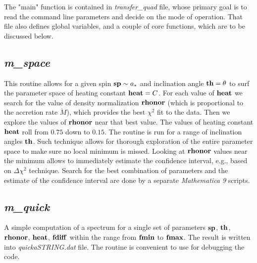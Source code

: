 \documentclass{emulateapj}
\newcommand{\mat}{\textit{Mathematica 9 }}
\begin{document}
The "main" function is contained in \textit{transfer\_quad} file,
whose primary goal is to read the command line parameters and decide
on the mode of operation. That file also defines global variables, and
a couple of core functions, which are to be discussed below.

\subsection{\textit{m\_space}}
This routine allows for a given spin ${\bf sp}\sim a_*$ and inclination angle ${\bf th}=\theta$ to surf the parameter space of heating constant ${\bf heat}=C$.
For each value of ${\bf heat}$ we search for the value of density normalization ${\bf rhonor}$ (which is proportional to the accretion rate $\dot{M}$), 
which provides the best $\chi^2$ fit to the data. Then we explore the values of ${\bf rhonor}$ near that best value.
The values of heating constant ${\bf heat}$ roll from $0.75$ down to $0.15$.
The routine is run for a range of inclination angles ${\bf th}$.
Such technique allows for thorough exploration of the entire parameter space to make sure no local minimum is missed.
Looking at ${\bf rhonor}$ values near the minimum allows to immediately estimate the confidence interval, e.g., based on $\Delta\chi^2$ technique.
Search for the best combination of parameters and the estimate of the confidence interval are done by a separate \mat  scripts.

\subsection{\textit{m\_quick}}
A simple computation of a spectrum for a single set of parameters
${\bf sp}$, ${\bf th}$, ${\bf rhonor}$, ${\bf heat}$, ${\bf fdiff}$
within the range from ${\bf fmin}$ to ${\bf fmax}$. The result is
written into \textit{quickaSTRING.dat} file.  The routine is
convenient to use for debugging the code.
\end{document}
